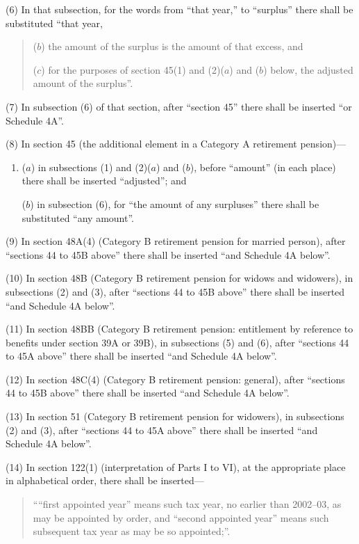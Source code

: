 \documentclass[12pt,a4paper]{article}
\begin{document}
(6) In that subsection, for the words from “that year,” to “surplus” there shall be substituted “that year,
\begin{quotation}
($b$) the amount of the surplus is the amount of that excess, and

($c$) for the purposes of section 45(1)  and (2)($a$)  and ($b$)  below, the adjusted amount of the surplus”.
\end{quotation}

(7) In subsection (6)  of that section, after “section 45” there shall be inserted “or Schedule 4A”.

(8) In section 45 (the additional element in a Category A retirement pension)—
\begin{enumerate}\item[]
($a$) in subsections (1)  and (2)($a$)  and ($b$), before “amount” (in each place) there shall be inserted “adjusted”; and

($b$) in subsection (6), for “the amount of any surpluses” there shall be substituted “any amount”.
\end{enumerate}

(9) In section 48A(4)  (Category B retirement pension for married person), after “sections 44 to 45B above” there shall be inserted “and Schedule 4A below”.

(10) In section 48B (Category B retirement pension for widows and widowers), in subsections (2)  and (3), after “sections 44 to 45B above” there shall be inserted “and Schedule 4A below”.

(11) In section 48BB (Category B retirement pension: entitlement by reference to benefits under section 39A or 39B), in subsections (5)  and (6), after “sections 44 to 45A above” there shall be inserted “and Schedule 4A below”.

(12) In section 48C(4)  (Category B retirement pension: general), after “sections 44 to 45B above” there shall be inserted “and Schedule 4A below”.

(13) In section 51 (Category B retirement pension for widowers), in subsections (2)  and (3), after “sections 44 to 45A above” there shall be inserted “and Schedule 4A below”.

(14) In section 122(1)  (interpretation of Parts I to VI), at the appropriate place in alphabetical order, there shall be inserted—
\begin{quotation}
““first appointed year” means such tax year, no earlier than 2002--03, as may be appointed by order, and “second appointed year” means such subsequent tax year as may be so appointed;”.
\end{quotation}
\end{document}
